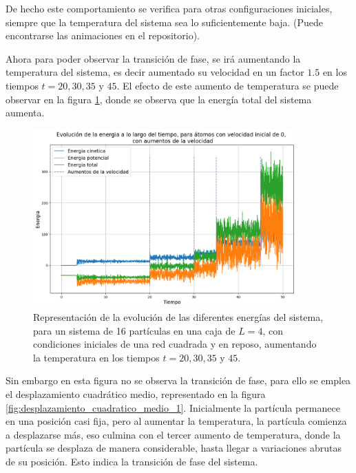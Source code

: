 \documentclass[11pt, twoside]{article} %
\begin{document}
De hecho este comportamiento se verifica para otras configuraciones iniciales, 
siempre que la temperatura del sistema sea lo suficientemente baja. (Puede encontrarse
las animaciones en el repositorio).

Ahora para poder observar la transición de fase, se irá aumentando la temperatura 
del sistema, es decir aumentado su velocidad en un factor $1.5$ en los tiempos 
$t=20, 30, 35$ y $45$. El efecto de este aumento de temperatura se puede observar
en la figura \ref{fig:transicion_fase}, donde se observa que la energía total del
sistema aumenta. 

\begin{figure}[h!]
    \centering
    \includegraphics[width=0.9\textwidth]{plots/apartado_6_energia_0.png}
    \caption{Representación de la evolución de las diferentes energías del sistema,
    para un sistema de 16 partículas en una caja de $L=4$, con condiciones iniciales 
    de una red cuadrada y en reposo, aumentando la temperatura en los tiempos 
    $t=20, 30, 35$ y $45$.}
    \label{fig:transicion_fase}
\end{figure}

Sin embargo en esta figura no se observa la transición de fase, para 
ello se emplea el desplazamiento cuadrático medio, representado en la figura 
\ref{fig:desplazamiento_cuadratico_medio_1}. Inicialmente la partícula permanece
en una posición casi fija, pero al aumentar la temperatura, la partícula comienza a
desplazarse más, eso culmina con el tercer aumento de temperatura, donde la partícula
se desplaza de manera considerable, hasta llegar a variaciones abrutas de su posición.
Esto indica la transición de fase del sistema.
\end{document}
